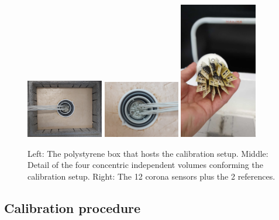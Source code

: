 \begin{figure}[htbp]
\centering
{\includegraphics[angle=90,width=0.3\textwidth]{images/image.png}}
{\includegraphics[angle=90,width=0.297\textwidth]{images/figure_16_a_bis.jpg}}
{\includegraphics[width=0.3\textwidth, trim=0cm 7cm 0cm 10.4cm, clip]{images/figure_16_c.jpg}}
\caption{Left: The polystyrene box that hosts the calibration setup. Middle: Detail of the four concentric independent volumes conforming the calibration setup. Right: The 12 corona sensors plus the 2 references.}
\label{fig:newSetup}
\end{figure}

\subsection{Calibration procedure}
\label{sec:new_calib_procedure}

